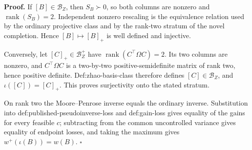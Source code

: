 \textbf{Proof.}
If \([B]\in\mathcal B_Z\), then \(S_B\succ0\), so both columns are nonzero and \(\operatorname{rank}(S_B)=2\).  Independent nonzero rescaling is the equivalence relation used by the ordinary projective class and by the rank-two stratum of the novel completion.  Hence \([B]\mapsto[B]_+\) is well defined and injective.

Conversely, let \([C]_+\in\mathcal B_Z^+\) have \(\operatorname{rank}(C^{\top}\Omega C)=2\).  Its two columns are nonzero, and \(C^{\top}\Omega C\) is a two-by-two positive-semidefinite matrix of rank two, hence positive definite.  Def:zhao-basis-class therefore defines \([C]\in\mathcal B_Z\), and \(\iota([C])=[C]_+\).  This proves surjectivity onto the stated stratum.

On rank two the Moore--Penrose inverse equals the ordinary inverse.  Substitution into def:published-pseudoinverse-loss and def:gain-loss gives equality of the gains for every feasible \(c\); subtracting from the common uncontrolled variance gives equality of endpoint losses, and taking the maximum gives \(w^+(\iota(B))=w(B)\). \(\square\)